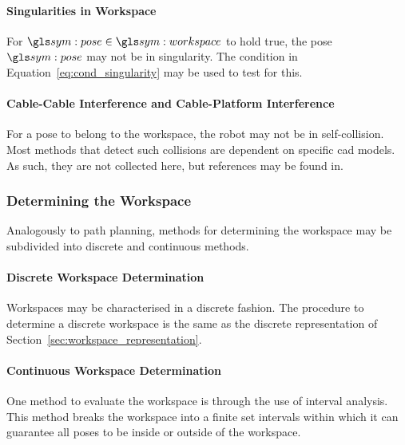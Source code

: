 			\paragraph{Singularities in Workspace}%
			\label{sec:singularities_in_workspace}

				For $\pose\in\workspace$ to hold true, the pose $\pose$ may not
				be in singularity. The condition in
				Equation~\ref{eq:cond_singularity} may be used to test for this.

			\paragraph{Cable-Cable Interference and Cable-Platform Interference}%
			\label{sec:cable_cable_interference_and_cable_platform_interference}

				For a pose to belong to the workspace, the robot may not be in
				self-collision. Most methods that detect such collisions are
				dependent on specific \gls{cad} models. As such, they are not
				collected here, but references may be found in.

		\subsubsection{Determining the Workspace}%
		\label{sec:determining_the_workspace}

			Analogously to path planning, methods for determining the workspace
			may be subdivided into discrete and continuous methods.

			\paragraph{Discrete Workspace Determination}%
			\label{sec:discrete_workspace_determination}

				Workspaces may be characterised in a discrete fashion. The
				procedure to determine a discrete workspace is the same as the
				discrete representation of
				Section~\ref{sec:workspace_representation}.

			\paragraph{Continuous Workspace Determination}%
			\label{sec:continuous_workspace_determination}

				One method to evaluate the workspace is through the use of
				interval analysis. This method breaks the workspace into
				a finite set intervals within which it can guarantee all poses
				to be inside or outside of the workspace.

